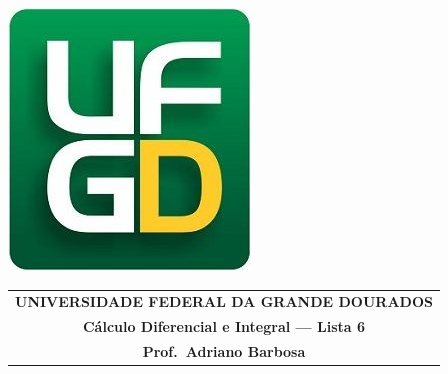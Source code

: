 \documentclass[a4paper,5pt]{amsbook}
\begin{document}
\thispagestyle{empty}
\pagestyle{empty}
\begin{minipage}[h]{0.14\textwidth}
	\includegraphics[scale=0.24]{../ufgd.png}
\end{minipage}
\begin{minipage}[h]{\textwidth}
\begin{tabular}{c}
{{\bf UNIVERSIDADE FEDERAL DA GRANDE DOURADOS}}\\
{{\bf C\'alculo Diferencial e Integral --- Lista 6}}\\
{{\bf Prof.\ Adriano Barbosa}}\\
\end{tabular}
\vspace{-0.45cm}
%
\end{minipage}

\end{document}
